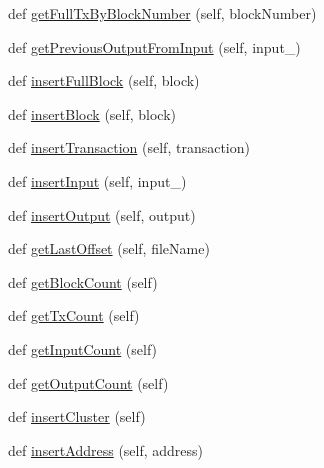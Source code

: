 \begin{DoxyCompactItemize}
\item 
def \hyperlink{classpostgreDb_1_1DatabaseWrapper_1_1DatabaseWrapper_afaf1391bc410291096d218a2343b8d52}{get\+Full\+Tx\+By\+Block\+Number} (self, block\+Number)
\item 
def \hyperlink{classpostgreDb_1_1DatabaseWrapper_1_1DatabaseWrapper_aaf7ce14583176b355c4b9c17e192be45}{get\+Previous\+Output\+From\+Input} (self, input\+\_\+)
\item 
def \hyperlink{classpostgreDb_1_1DatabaseWrapper_1_1DatabaseWrapper_a0dc299ec6e6c53e90eb1381d200b2026}{insert\+Full\+Block} (self, block)
\item 
def \hyperlink{classpostgreDb_1_1DatabaseWrapper_1_1DatabaseWrapper_ae72260c4408107303c0dc4837044c0b9}{insert\+Block} (self, block)
\item 
def \hyperlink{classpostgreDb_1_1DatabaseWrapper_1_1DatabaseWrapper_a6d64a3635710a6a7ba4ccad62c21dacc}{insert\+Transaction} (self, transaction)
\item 
def \hyperlink{classpostgreDb_1_1DatabaseWrapper_1_1DatabaseWrapper_ac6b59f2ca85fbf2ff0b4f2d92ab90499}{insert\+Input} (self, input\+\_\+)
\item 
def \hyperlink{classpostgreDb_1_1DatabaseWrapper_1_1DatabaseWrapper_af2733fa379504739957156fa4903af42}{insert\+Output} (self, output)
\item 
def \hyperlink{classpostgreDb_1_1DatabaseWrapper_1_1DatabaseWrapper_a481a48950bd942eed40e2a22176d33e8}{get\+Last\+Offset} (self, file\+Name)
\item 
def \hyperlink{classpostgreDb_1_1DatabaseWrapper_1_1DatabaseWrapper_a8df7f4e0601260a9fb187b3f52a3cd93}{get\+Block\+Count} (self)
\item 
def \hyperlink{classpostgreDb_1_1DatabaseWrapper_1_1DatabaseWrapper_af8f3c176e3875823994e9635c27cbe5c}{get\+Tx\+Count} (self)
\item 
def \hyperlink{classpostgreDb_1_1DatabaseWrapper_1_1DatabaseWrapper_a11585d2dbd0ac1d9cda611d9b6b2fb25}{get\+Input\+Count} (self)
\item 
def \hyperlink{classpostgreDb_1_1DatabaseWrapper_1_1DatabaseWrapper_a9786a724486081babb50122dfe6d0f80}{get\+Output\+Count} (self)
\item 
def \hyperlink{classpostgreDb_1_1DatabaseWrapper_1_1DatabaseWrapper_a3caf856162be06c4951c223fa485e294}{insert\+Cluster} (self)
\item 
def \hyperlink{classpostgreDb_1_1DatabaseWrapper_1_1DatabaseWrapper_aa1382df31079593373a9315b4c1bc3c9}{insert\+Address} (self, address)
\item 

\end{DoxyCompactItemize}
